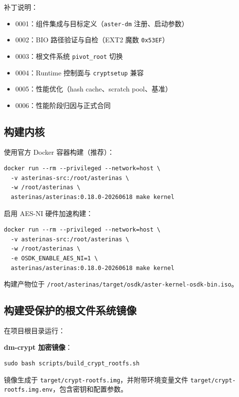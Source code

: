 补丁说明：
\begin{itemize}
    \item 0001：组件集成与目标定义（\texttt{aster-\allowbreak dm} 注册、启动参数）
    \item 0002：BIO 路径验证与自检（EXT2 魔数 \texttt{0x53EF}）
    \item 0003：根文件系统 \texttt{pivot\_\allowbreak root} 切换
    \item 0004：Runtime 控制面与 \texttt{cryptsetup} 兼容
    \item 0005：性能优化（hash cache、scratch pool、基准）
    \item 0006：性能阶段归因与正式合同
\end{itemize}

\subsection{构建内核}

使用官方 Docker 容器构建（推荐）：
\begin{lstlisting}[basicstyle=\ttfamily\small, breaklines=true]
docker run --rm --privileged --network=host \
  -v asterinas-src:/root/asterinas \
  -w /root/asterinas \
  asterinas/asterinas:0.18.0-20260618 make kernel
\end{lstlisting}

启用 AES-NI 硬件加速构建：
\begin{lstlisting}[basicstyle=\ttfamily\small, breaklines=true]
docker run --rm --privileged --network=host \
  -v asterinas-src:/root/asterinas \
  -w /root/asterinas \
  -e OSDK_ENABLE_AES_NI=1 \
  asterinas/asterinas:0.18.0-20260618 make kernel
\end{lstlisting}

构建产物位于 \texttt{/root/\allowbreak asterinas/\allowbreak target/\allowbreak osdk/\allowbreak aster-\allowbreak kernel-\allowbreak osdk-\allowbreak bin.iso}。

\subsection{构建受保护的根文件系统镜像}

在项目根目录运行：

\textbf{dm-crypt 加密镜像}：
\begin{lstlisting}[basicstyle=\ttfamily\small, breaklines=true]
sudo bash scripts/build_crypt_rootfs.sh
\end{lstlisting}

镜像生成于 \texttt{target/\allowbreak crypt-\allowbreak rootfs.img}，并附带环境变量文件 \texttt{target/\allowbreak crypt-\allowbreak rootfs.img.env}，包含密钥和配置参数。

